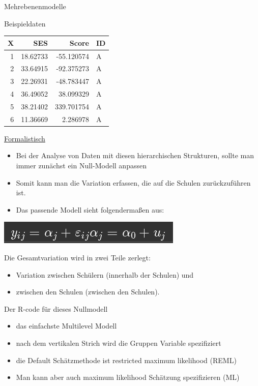 \documentclass[ignorenonframetext,]{beamer}
\providecommand{\tightlist}{%
\setlength{\itemsep}{0pt}\setlength{\parskip}{0pt}}
\begin{document}
\begin{frame}[fragile]{Mehrebenenmodelle}
\begin{block}{Beispieldaten}
\begin{longtable}[]{@{}rrrl@{}}
\toprule
X & SES & Score & ID\tabularnewline
\midrule
\endhead
1 & 18.62733 & -55.120574 & A\tabularnewline
2 & 33.64915 & -92.375273 & A\tabularnewline
3 & 22.26931 & -48.783447 & A\tabularnewline
4 & 36.49052 & 38.099329 & A\tabularnewline
5 & 38.21402 & 339.701754 & A\tabularnewline
6 & 11.36669 & 2.286978 & A\tabularnewline
\bottomrule
\end{longtable}

\end{block}

\begin{block}{\href{http://kesdev.com/you-got-latex-in-my-markdown/}{Formalistisch}}

\begin{itemize}
\item
  Bei der Analyse von Daten mit diesen hierarchischen Strukturen, sollte
  man immer zunächst ein Null-Modell anpassen
\item
  Somit kann man die Variation erfassen, die auf die Schulen
  zurückzuführen ist.
\item
  Das passende Modell sieht folgendermaßen aus:
\end{itemize}

\includegraphics{./tex2pdf.9796/297df716f76288e608b5aebbd30917aeea4258a7.png}

Die Gesamtvariation wird in zwei Teile zerlegt:

\begin{itemize}
\tightlist
\item
  Variation zwischen Schülern (innerhalb der Schulen) und
\item
  zwischen den Schulen (zwischen den Schulen).
\end{itemize}

\end{block}

\begin{block}{Der R-code für dieses Nullmodell}

\begin{itemize}
\tightlist
\item
  das einfachste Multilevel Modell
\item
  nach dem vertikalen Strich wird die Gruppen Variable spezifiziert
\item
  die Default Schätzmethode ist restricted maximum likelihood (REML)
\item
  Man kann aber auch maximum likelihood Schätzung spezifizieren (ML)
\end{itemize}


\end{block}
\end{frame}
\end{document}
